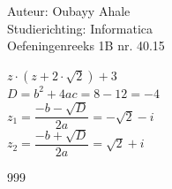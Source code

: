 \documentclass[a4paper]{article}
\begin{document}
  
\noindent \large Auteur: Oubayy Ahale          \\
\noindent \large Studierichting: Informatica   \\
\noindent \large Oefeningenreeks 1B nr. 40.15   \\

\medskip

\normalsize

$ z \cdot (z +  2 \cdot \sqrt{2}) + 3 $\\


$ D = b^2 + 4ac = 8 - 12 = -4         $\\

$ z_1 = \dfrac{-b - \sqrt{D}}{2a} = -\sqrt{2} - i $\\

$  z_2 = \dfrac{-b + \sqrt{D}}{2a} = \sqrt{2} + i $\\

\begin{thebibliography}{999}
\end{thebibliography}
\end{document}
